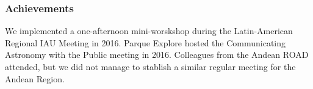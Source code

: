 \subsubsection{Achievements}
We implemented a one-afternoon mini-worskshop during the Latin-American Regional IAU Meeting in 2016.
Parque Explore hosted the Communicating Astronomy with the Public meeting in 2016. Colleagues from the Andean ROAD attended,
but we did not manage to stablish a similar regular meeting for the Andean Region. 
